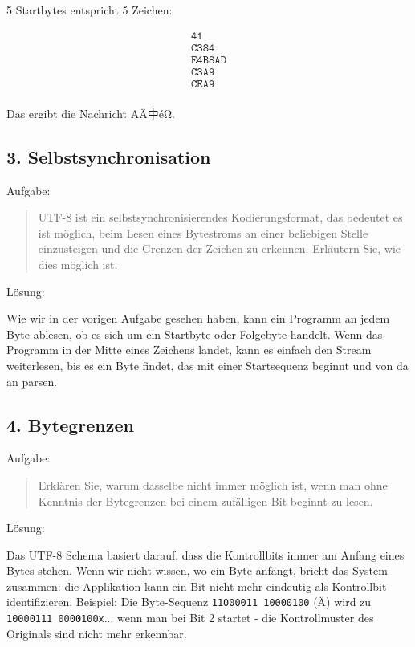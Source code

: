 \documentclass{article}
\newcommand{\cjk}[1]{{\cjkfont #1}}
\begin{document}
5 Startbytes entspricht 5 Zeichen:

\begin{align*}
    \texttt{41} \\
    \texttt{C384} \\
    \texttt{E4B8AD} \\
    \texttt{C3A9} \\
    \texttt{CEA9} \\
\end{align*}

Das ergibt die Nachricht AÄ\cjk{中}éΩ.

\subsection*{3. Selbstsynchronisation}

Aufgabe:

\begin{quote}
    UTF-8 ist ein selbstsynchronisierendes Kodierungsformat, das bedeutet es ist
möglich, beim Lesen eines Bytestroms an einer beliebigen Stelle einzusteigen
und die Grenzen der Zeichen zu erkennen. Erläutern Sie, wie dies möglich
ist.
\end{quote}

\noindent Lösung:

Wie wir in der vorigen Aufgabe gesehen haben, kann ein Programm an jedem Byte ablesen, ob es sich um ein Startbyte oder Folgebyte handelt. Wenn das Programm in der Mitte eines Zeichens landet, kann es einfach den Stream weiterlesen, bis es ein Byte findet, das mit einer Startsequenz beginnt und von da an parsen.

\subsection*{4. Bytegrenzen}

Aufgabe:

\begin{quote}
Erklären Sie, warum dasselbe nicht immer möglich ist, wenn man ohne
Kenntnis der Bytegrenzen bei einem zufälligen Bit beginnt zu lesen.
\end{quote}

\noindent Lösung:

Das UTF-8 Schema basiert darauf, dass die Kontrollbits immer am Anfang eines Bytes stehen. 
Wenn wir nicht wissen, wo ein Byte anfängt, bricht das System zusammen: die Applikation
kann ein Bit nicht mehr eindeutig als Kontrollbit identifizieren. Beispiel: Die Byte-Sequenz \texttt{11000011 10000100} (Ä) wird zu \texttt{10000111 0000100x}... wenn man bei Bit 2 startet - die Kontrollmuster des Originals sind nicht mehr erkennbar.
\end{document}
